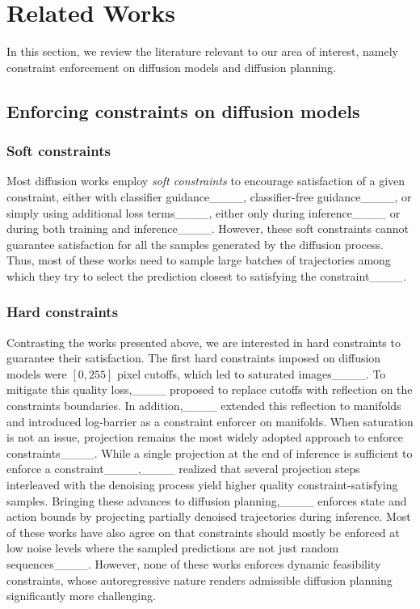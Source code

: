 \section{Related Works}
\label{sec: related works}

In this section, we review the literature relevant to our area of interest, namely constraint enforcement on diffusion models and diffusion planning.

\subsection{Enforcing constraints on diffusion models}

\subsubsection{Soft constraints}

Most diffusion works employ \emph{soft constraints} to encourage satisfaction of a given constraint, either with classifier guidance____, classifier-free guidance____, or simply using additional loss terms____, either only during inference____ or during both training and inference____.
However, these soft constraints cannot guarantee satisfaction for all the samples generated by the diffusion process. Thus, most of these works need to sample large batches of trajectories among which they try to select the prediction closest to satisfying the constraint____.



\subsubsection{Hard constraints}

Contrasting the works presented above, we are interested in hard constraints to guarantee their satisfaction. 
The first hard constraints imposed on diffusion models were $[0, 255]$ pixel cutoffs, which led to saturated images____. To mitigate this quality loss,____ proposed to replace cutoffs with reflection on the constraints boundaries. In addition,____ extended this reflection to manifolds and introduced log-barrier as a constraint enforcer on manifolds.
When saturation is not an issue, projection remains the most widely adopted approach to enforce constraints____.
While a single projection at the end of inference is sufficient to enforce a constraint____,____ realized that several projection steps interleaved with the denoising process yield higher quality constraint-satisfying samples.
Bringing these advances to diffusion planning,____ enforces state and action bounds by projecting partially denoised trajectories during inference. 
Most of these works have also agree on that constraints should mostly be enforced at low noise levels where the sampled predictions are not just random sequences____. However, none of these works enforces dynamic feasibility constraints, whose autoregressive nature renders admissible diffusion planning significantly more challenging.


